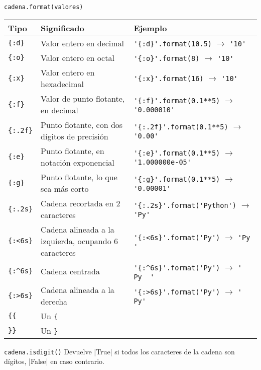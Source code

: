 \begin{referencia_python}
\begin{sintaxis}{\lstinline!cadena.format(valores)!}
\begin{center}
\begin{tabular}{l p{4cm} l}
 {\bf Tipo} & {\bf Significado} & {\bf Ejemplo} \\
\hline
\verb!{:d}! & {\footnotesize Valor entero en decimal} & \lstinline!'{:d}'.format(10.5)! $\rightarrow$ \lstinline!'10'! \\
\verb!{:o}! & {\footnotesize Valor entero en octal} & \lstinline!'{:o}'.format(8)! $\rightarrow$ \lstinline!'10'! \\
\verb!{:x}! & {\footnotesize Valor entero en hexadecimal} & \lstinline!'{:x}'.format(16)! $\rightarrow$ \lstinline!'10'! \\
\verb!{:f}! & {\footnotesize Valor de punto flotante, en decimal} &
  \lstinline!'{:f}'.format(0.1**5)! $\rightarrow$ \lstinline!'0.000010'! \\
\verb!{:.2f}! & {\footnotesize Punto flotante, con dos dígitos de precisión} &
  \lstinline!'{:.2f}'.format(0.1**5)! $\rightarrow$ \lstinline!'0.00'! \\
\verb!{:e}! & {\footnotesize Punto flotante, en notación exponencial} &
  \lstinline!'{:e}'.format(0.1**5)! $\rightarrow$ \lstinline!'1.000000e-05'! \\
\verb!{:g}! & {\footnotesize Punto flotante, lo que sea más corto} &
  \lstinline!'{:g}'.format(0.1**5)! $\rightarrow$ \lstinline!'0.00001'! \\
\verb!{:.2s}! & {\footnotesize Cadena recortada en 2 caracteres} &
  \lstinline!'{:.2s}'.format('Python')! $\rightarrow$ \lstinline!'Py'! \\
\verb!{:<6s}! & {\footnotesize Cadena alineada a la izquierda, ocupando 6 caracteres} &
  \lstinline!'{:<6s}'.format('Py')! $\rightarrow$ \lstinline!'Py    '! \\
\verb!{:^6s}! & {\footnotesize Cadena centrada} &
  \lstinline!'{:^6s}'.format('Py')! $\rightarrow$ \lstinline!'  Py  '! \\
\verb!{:>6s}! & {\footnotesize Cadena alineada a la derecha} &
  \lstinline!'{:>6s}'.format('Py')! $\rightarrow$ \lstinline!'    Py'! \\
\verb!{{! & {\footnotesize Un \verb!{!} \\
\verb!}}! & {\footnotesize Un \verb!}!} \\
\end{tabular}
\end{center}

\end{sintaxis}

\begin{sintaxis}{\lstinline!cadena.isdigit()!}
Devuelve |True| si todos los caracteres de la cadena son dígitos, |False| en
caso contrario.
\end{sintaxis}


\end{referencia_python}

